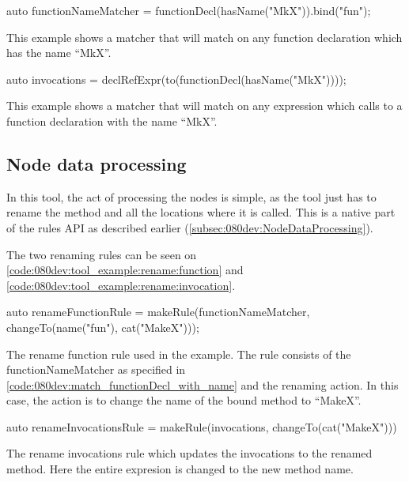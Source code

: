 \begin{listing}[H]
    \begin{cppcode}
auto functionNameMatcher = functionDecl(hasName("MkX")).bind("fun");
    \end{cppcode}
    \caption{This example shows a matcher that will match on any function declaration which has the name ``MkX''.}
    \label{code:080dev:match_functionDecl_with_name}
\end{listing}

\begin{listing}[H]
    \begin{cppcode}
auto invocations = declRefExpr(to(functionDecl(hasName("MkX"))));
    \end{cppcode}
    \caption{This example shows a matcher that will match on any expression which calls to a function declaration with the name ``MkX''.}
    \label{code:080dev:match_expr_call_to_funcDecl_with_name}
\end{listing}

\subsection{Node data processing}

In this tool, the act of processing the nodes is simple, as the tool just has to rename the method and all the locations where it is called. This is a native part of the rules API as described earlier (\cref{subsec:080dev:NodeDataProcessing}). 

The two renaming rules can be seen on \cref{code:080dev:tool_example:rename:function} and \cref{code:080dev:tool_example:rename:invocation}.

\begin{listing}[H]
    \begin{cppcode}
auto renameFunctionRule = makeRule(functionNameMatcher, changeTo(name("fun"), cat("MakeX")));
    \end{cppcode}
    \caption{The rename function rule used in the example. The rule consists of the functionNameMatcher as specified in \cref{code:080dev:match_functionDecl_with_name} and the renaming action. In this case, the action is to change the name of the bound method to ``MakeX''.}
    \label{code:080dev:tool_example:rename:function}
\end{listing}

\begin{listing}[H]
    \begin{cppcode}
auto renameInvocationsRule = makeRule(invocations, changeTo(cat("MakeX")))
    \end{cppcode}
    \caption{The rename invocations rule which updates the invocations to the renamed method. Here the entire expresion is changed to the new method name.}
    \label{code:080dev:tool_example:rename:invocation}
\end{listing}

